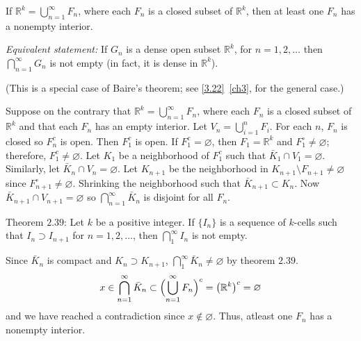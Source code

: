 \begin{exercise}
  If \(\mathbb{R}^k = \bigcup_{n = 1}^{\infty}F_n\), where each \(F_n\) is a
  closed subset of \(\mathbb{R}^k\), then at least one \(F_n\) has a nonempty
  interior.
  \par\smallskip
  \textit{Equivalent statement:} If \(G_n\) is a dense open subset
  \(\mathbb{R}^k\), for \(n = 1,2,\ldots\) then
  \(\bigcap_{n = 1}^{\infty}G_n\) is not empty (in fact, it is dense in
  \(\mathbb{R}^k\)).
  \par\smallskip
  (This is a special case of Baire's theorem; see \cref{3.22}~\cref{ch3}, for
  the general case.)
  \par\smallskip
  Suppose on the contrary that \(\mathbb{R}^k = \bigcup_{n = 1}^{\infty}F_n\),
  where each \(F_n\) is a closed subset of \(\mathbb{R}^k\) and that each
  \(F_n\) has an empty interior.
  Let \(V_n = \bigcup_{i = 1}^nF_i\).
  For each \(n\), \(F_n\)  is closed so \(F_n^c\) is open.
  Then \(F_1^c\) is open.
  If \(F_1^c = \varnothing\), then \(F_1 = \mathbb{R}^k\) and
  \(F_1^{\circ}\neq\varnothing\); therefore, \(F_1^c\neq\varnothing\).
  Let \(K_1\) be a neighborhood of \(F_1^c\) such that
  \(\bar{K}_1\cap V_1 = \varnothing\).
  Similarly, let \(\bar{K}_n\cap V_n = \varnothing\).
  Let \(K_{n + 1}\) be the neighborhood in
  \(K_{n + 1}\setminus F_{n + 1}\neq\varnothing\) since
  \(F_{n + 1}^{\circ}\neq\varnothing\).
  Shrinking the neighborhood such that \(\bar{K}_{n + 1}\subset K_n\).
  Now \(\bar{K}_{n + 1}\cap V_{n + 1} = \varnothing\) so
  \(\bigcap_{n = 1}^{\infty}\bar{K}_n\) is disjoint for all \(F_n\).
  \par\smallskip
  Theorem \(2.39\): Let \(k\) be a positive integer.
  If \(\{I_n\}\) is a sequence of \(k\)-cells such that
  \(I_n\supset I_{n + 1}\) for \(n = 1,2,\ldots\), then
  \(\bigcap_1^{\infty}I_n\) is not empty.
  \par\smallskip
  Since \(\bar{K}_n\) is compact and \(K_n\supset K_{n + 1}\),
  \(\bigcap_1^{\infty}\bar{K}_n\neq\varnothing\) by theorem \(2.39\).
  \[
  x\in\bigcap_{n = 1}^{\infty}\bar{K}_n\subset
  \Bigl(\bigcup_{n = 1}^{\infty}F_n\Bigr)^c = \bigl(\mathbb{R}^k\bigr)^c
  = \varnothing
  \]
  and we have reached a contradiction since \(x\not\in\varnothing\).
  Thus, atleast one \(F_n\) has a nonempty interior.
\end{exercise}

